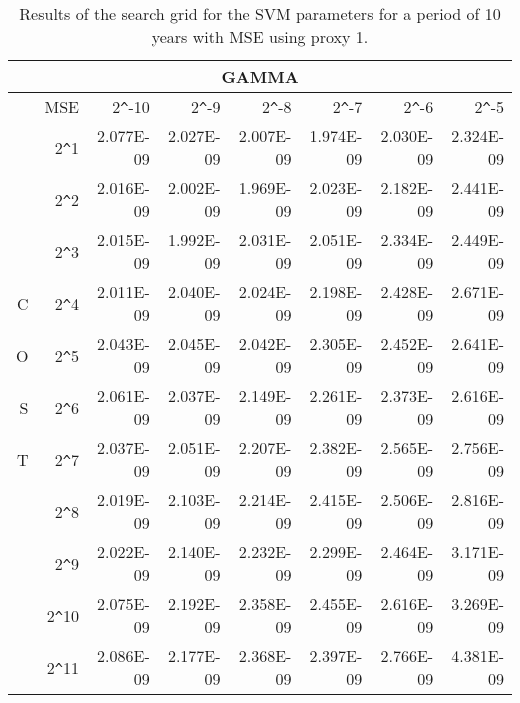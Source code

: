 \begin{table}[h!]
\centering
\begin{adjustbox}{width=\textwidth}
\begin{tabular}{|r|r|rrrrrr|}
\hline
\multicolumn{8}{|c|}{GAMMA} \tabularnewline
\hline
  &MSE& 2\verb|^|-10 & 2\verb|^|-9 & 2\verb|^|-8 & 2\verb|^|-7 & 2\verb|^|-6 & 2\verb|^|-5 \\ 
  \hline
  &2\verb|^|1 & 2.077E-09 & 2.027E-09 & 2.007E-09 & 1.974E-09 & 2.030E-09 & 2.324E-09 \\ 
  &2\verb|^|2 & 2.016E-09 & 2.002E-09 & 1.969E-09 & 2.023E-09 & 2.182E-09 & 2.441E-09 \\ 
  &2\verb|^|3 & 2.015E-09 & 1.992E-09 & 2.031E-09 & 2.051E-09 & 2.334E-09 & 2.449E-09 \\ 
  C&2\verb|^|4 & 2.011E-09 & 2.040E-09 & 2.024E-09 & 2.198E-09 & 2.428E-09 & 2.671E-09 \\ 
  O&2\verb|^|5 & 2.043E-09 & 2.045E-09 & 2.042E-09 & 2.305E-09 & 2.452E-09 & 2.641E-09 \\ 
  S&2\verb|^|6 & 2.061E-09 & 2.037E-09 & 2.149E-09 & 2.261E-09 & 2.373E-09 & 2.616E-09 \\ 
  T&2\verb|^|7 & 2.037E-09 & 2.051E-09 & 2.207E-09 & 2.382E-09 & 2.565E-09 & 2.756E-09 \\ 
  &2\verb|^|8 & 2.019E-09 & 2.103E-09 & 2.214E-09 & 2.415E-09 & 2.506E-09 & 2.816E-09 \\ 
  &2\verb|^|9 & 2.022E-09 & 2.140E-09 & 2.232E-09 & 2.299E-09 & 2.464E-09 & 3.171E-09 \\ 
  &2\verb|^|10 & 2.075E-09 & 2.192E-09 & 2.358E-09 & 2.455E-09 & 2.616E-09 & 3.269E-09 \\ 
  &2\verb|^|11 & 2.086E-09 & 2.177E-09 & 2.368E-09 & 2.397E-09 & 2.766E-09 & 4.381E-09 \\ 
   \hline
\end{tabular}
\end{adjustbox}
\caption{Results of the search grid for the SVM parameters for a period of 10 years with MSE using proxy 1.}
\end{table}